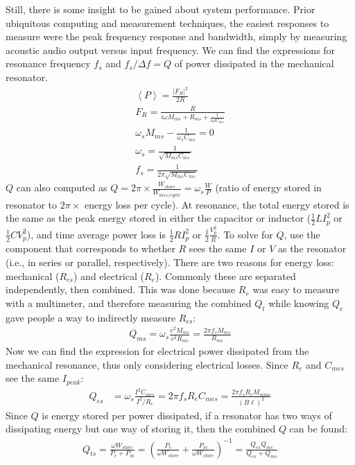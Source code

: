 \documentclass[10pt,letterpaper]{book}
\begin{document}
Still, there is some insight to be gained about system performance. Prior ubiquitous computing and measurement techniques, the easiest responses to measure were the peak frequency response and bandwidth, simply by measuring acoustic audio output versus input frequency.  We can find the expressions for resonance frequency $f_s$ and $f_s/\Delta f = Q$ of power dissipated in the mechanical resonator.
\begin{align}
\left\langle P\right\rangle=\frac{\left|F_R \right|^2}{2R}\\
F_R=\frac{R}{i\omega M_{ms}+R_{ms}+\frac{1}{i\omega C_{ms}}}\\
\omega_s M_{ms}-\frac{1}{\omega_s C_{ms}}=0\\
\omega_s=\frac{1}{\sqrt{M_{ms}C_{ms}}}\\
f_s=\frac{1}{2\pi\sqrt{M_{ms}C_{ms}}}
\end{align}
$Q$ can also computed as $Q=2\pi\times\frac{W_{store}}{W_{loss/cycle}}=\omega_s\frac{W}{P}$ (ratio of energy stored in resonator to $2\pi\times$ energy loss per cycle). At resonance, the total energy stored is the same as the peak energy stored in either the capacitor or inductor ($\frac{1}{2}LI_p^2$ or $\frac{1}{2}CV_p^2$), and time average power loss is $\frac{1}{2}RI_p^2$ or $\frac{1}{2}\frac{V_p^2}{R}$. To solve for $Q$, use the component that corresponds to whether $R$ sees the same $I$ or $V$ as the resonator (i.e., in series or parallel, respectively). There are two reasons for energy loss: mechanical ($R_{es}$) and electrical ($R_{e}$). Commonly these are separated independently, then combined. This was done because $R_e$ was easy to measure with a multimeter, and therefore measuring the combined $Q_t$ while knowing $Q_e$ gave people a way to indirectly measure $R_{es}$:
\begin{align}
Q_{ms}=\omega_s\frac{v^2M_{ms}}{v^2R_{ms}}=\frac{2\pi f_s M_{ms}}{R_{ms}}
\end{align}
Now we can find the expression for electrical power dissipated from the mechanical resonance, thus only considering electrical losses. Since $R_e$ and $C_{mes}$ see the same $I_{peak}$: 
\begin{align}
Q_{es}&=\omega_s\frac{I^2 C_{mes}}{I^2/R_e}=2\pi f_s R_{e} C_{mes}=\frac{2\pi f_s R_{e} M_{mms}}{(B\ell)^2}
\end{align}
Since $Q$ is energy stored per power dissipated, if a resonator has two ways of dissipating energy but one way of storing it, then the combined $Q$ can be found:
\begin{align}
Q_{ts}=\frac{\omega W_{store}}{P_e+P_m}=\left(\frac{P_e}{\omega W_{store}}+\frac{P_m}{\omega W_{store}}\right)^{-1}=\frac{Q_{es}Q_{ms}}{Q_{es}+Q_{ms}}\label{eq:Qts}
\end{align}
\end{document}
